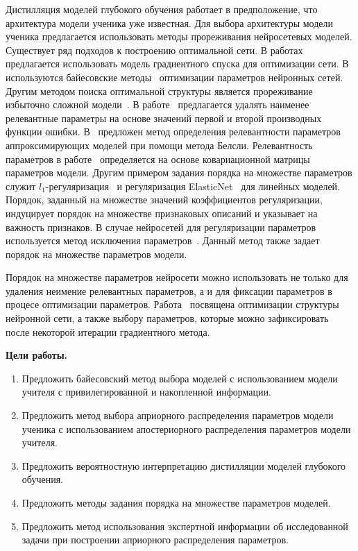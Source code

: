 Дистилляция моделей глубокого обучения работает в предположение, что архитектура модели ученика уже известная. Для выбора архитектуры модели ученика предлагается использовать методы прореживания нейросетевых моделей. Существует ряд подходов к построению оптимальной сети. В работах~\cite{maclarin2015, luketina2015} предлагается использовать модель градиентного спуска для оптимизации сети. В~\cite{molchanov2017} используются байесовские методы~\cite{neal1995} оптимизации параметров нейронных сетей. Другим методом поиска оптимальной структуры является прореживание избыточно сложной модели~\cite{cun1990, louizos2017, graves2011}. В работе~\cite{cun1990} предлагается удалять наименее релевантные параметры на основе значений первой и второй производных функции ошибки. В~\cite{grabovoy2019} предложен метод определения релевантности параметров аппроксимирующих моделей при помощи метода Белсли. Релевантность параметров в работе~\cite{grabovoy2019} определяется на основе ковариационной матрицы параметров модели.
Другим примером задания порядка на множестве параметров служит $l_1$-регуляризация~\cite{Tibshirani1996} и регуляризация ElasticNet~\cite{Hastie2005} для линейных моделей.
Порядок, заданный на множестве значений коэффициентов регуляризации, индуцирует порядок на множестве признаковых описаний и указывает на важность признаков.
В случае нейросетей для регуляризации параметров используется метод исключения параметров~\cite{srivastava2014, molchanov2017}.
Данный метод также задает порядок на множестве параметров модели.

Порядок на множестве параметров нейросети можно использовать не только для удаления неимение релевантных параметров, а и для фиксации параметров в процесе оптимизации параметров. Работа~\cite{grabovoy2020} посвящена оптимизации структуры нейронной сети, а также выбору параметров, которые можно зафиксировать после некоторой итерации градиентного метода.


\vspace{0.5cm}
\textbf{Цели работы.}
\vspace{0.2cm}
\begin{enumerate}
\item Предложить байесовский метод выбора моделей с использованием модели учителя с привилегированной и накопленной информации.
\item Предложить метод выбора априорного распределения параметров модели ученика с использованием апостериорного распределения параметров модели учителя.
\item Предложить вероятностную интерпретацию дистилляции моделей глубокого обучения.
\item Предложить методы задания порядка на множестве параметров моделей.
\item Предложить метод использования экспертной информации об исследованной задачи при построении априорного распределения параметров.
\end{enumerate}

